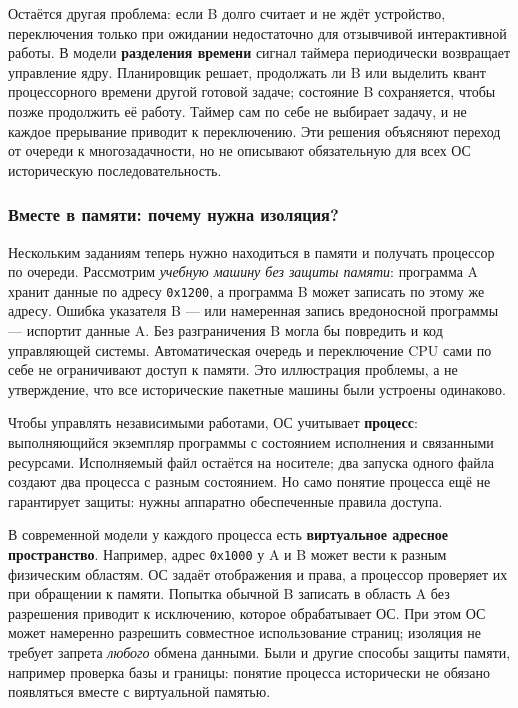 Остаётся другая проблема: если B долго считает и не ждёт устройство,
переключения только при ожидании недостаточно для отзывчивой интерактивной
работы. В модели \textbf{разделения времени} сигнал таймера периодически
возвращает управление ядру. Планировщик решает, продолжать ли B или выделить
квант процессорного времени другой готовой задаче; состояние B сохраняется,
чтобы позже продолжить её работу. Таймер сам по себе не выбирает задачу, и не
каждое прерывание приводит к переключению. Эти решения объясняют переход от
очереди к многозадачности, но не описывают обязательную для всех ОС
историческую последовательность.

\subsubsection*{Вместе в памяти: почему нужна изоляция?}

Нескольким заданиям теперь нужно находиться в памяти и получать процессор
по очереди. Рассмотрим \emph{учебную машину без защиты памяти}: программа A
хранит данные по адресу \texttt{0x1200}, а программа B может записать по
этому же адресу. Ошибка указателя B --- или намеренная запись вредоносной
программы --- испортит данные A. Без разграничения B могла бы повредить и
код управляющей системы. Автоматическая очередь и переключение CPU сами по
себе не ограничивают доступ к памяти. Это иллюстрация проблемы, а не
утверждение, что все исторические пакетные машины были устроены одинаково.

Чтобы управлять независимыми работами, ОС учитывает \textbf{процесс}:
выполняющийся экземпляр программы с состоянием исполнения и связанными
ресурсами. Исполняемый файл остаётся на носителе; два запуска одного файла
создают два процесса с разным состоянием. Но само понятие процесса ещё не
гарантирует защиты: нужны аппаратно обеспеченные правила доступа.

В современной модели у каждого процесса есть \textbf{виртуальное адресное
пространство}. Например, адрес \texttt{0x1000} у A и B может вести к разным
физическим областям. ОС задаёт отображения и права, а процессор проверяет
их при обращении к памяти. Попытка обычной B записать в область A без
разрешения приводит к исключению, которое обрабатывает ОС. При этом ОС может
намеренно разрешить совместное использование страниц; изоляция не требует
запрета \emph{любого} обмена данными. Были и другие способы защиты памяти,
например проверка базы и границы: понятие процесса исторически не обязано
появляться вместе с виртуальной памятью.

